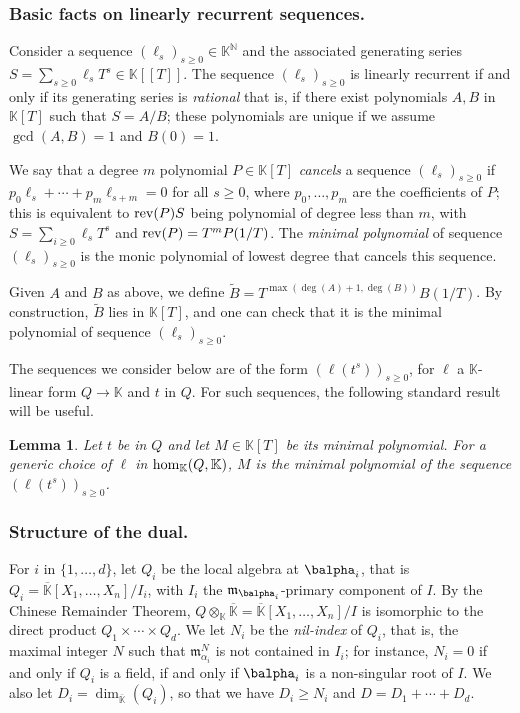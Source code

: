 \documentclass[12pt]{article}
\newtheorem{Lemma}{Lemma}
\def\N {\ensuremath{\mathbb{N}}}
\def\K {\ensuremath{\mathbb{K}}}
\def\Kbar {{\ensuremath{\overline{\mathbb{K}}}}}
\def\D {\ensuremath{D}}
\def\m {\ensuremath{\mathfrak{m}}}
\def\K{\mathbb{K}}
\begin{document}
\subsubsection{Basic facts on linearly recurrent sequences.} Consider a sequence $(\ell_s)_{s \ge 0} \in \K^\N$
and the associated generating series $S=\sum_{s \ge 0} \ell_s T^s \in
\K[[T]]$. The sequence $(\ell_s)_{s \ge 0}$ is {\rm linearly recurrent} if and
only if its generating series is {\em rational} that is, if there
exist polynomials $A,B$ in $\K[T]$ such that $S=A/B$; these
polynomials are unique if we assume $\gcd(A,B)=1$ and $B(0)=1$. 

We say that a degree $m$ polynomial $P\in\K[T]$ {\em cancels} a
sequence $(\ell_s)_{s \ge 0}$ if $p_0 \ell_s + \cdots + p_m
\ell_{s+m}=0$ for all $s \ge 0$, where $p_0,\dots,p_m$ are the
coefficients of $P$; this is equivalent to ${\rm rev}(P) S$ being
polynomial of degree less than $m$, with $S=\sum_{i \ge 0} \ell_s T^s$
and ${\rm rev}(P)=T^m P(1/T)$. The {\em minimal polynomial} of
sequence $(\ell_s)_{s \ge 0}$ is the monic polynomial of lowest degree
that cancels this sequence.

Given $A$ and $B$ as above, we define $\tilde B =
T^{\max(\deg(A)+1,\deg(B))}B(1/T)$.  By construction, $\tilde B$ lies
in $\K[T]$, and one can check that it is the minimal polynomial of
sequence $(\ell_s)_{s \ge 0}$.

The sequences we consider below are of the form $(\ell(t^s))_{s \ge
	0}$, for $\ell$ a $\K$-linear form $Q \to \K$ and $t$ in $Q$. For such
sequences, the following standard result will be useful.
\begin{Lemma}\label{lemma:minpoly}
	Let $t$ be in $Q$ and let $M \in \K[T]$ be its minimal
	polynomial. For a generic choice of $\ell$ in ${\rm hom}_\K(Q,\K)$,
	$M$ is the minimal polynomial of the sequence $(\ell(t^s))_{s \ge
		0}$.
\end{Lemma}





\subsubsection{Structure of the dual.}
For $i$ in $\{1,\dots,d\}$, let $Q_i$ be the local algebra at
$\balpha_i$, that is $Q_i=\Kbar[X_1,\dots,X_n]/I_i$, with $I_i$ the
$\m_{\balpha_i}$-primary component of $I$. By the Chinese Remainder
Theorem, $Q\otimes_\K \Kbar=\Kbar[X_1,\dots,X_n]/I$ is isomorphic to
the direct product $Q_1\times \cdots \times Q_d$.  We let $N_i$ be the
{\em nil-index} of $Q_i$, that is, the maximal integer $N$ such that
$\m_{\alpha_i}^N$ is not contained in $I_i$; for instance, $N_i=0$ if
and only if $Q_i$ is a field, if and only if $\balpha_i$ is a
non-singular root of $I$. We also let
$\D_i=\dim_\Kbar(Q_i)$, so that we have $D_i \ge N_i$ and $\D=\D_1 + \cdots + \D_d$.
\end{document}
